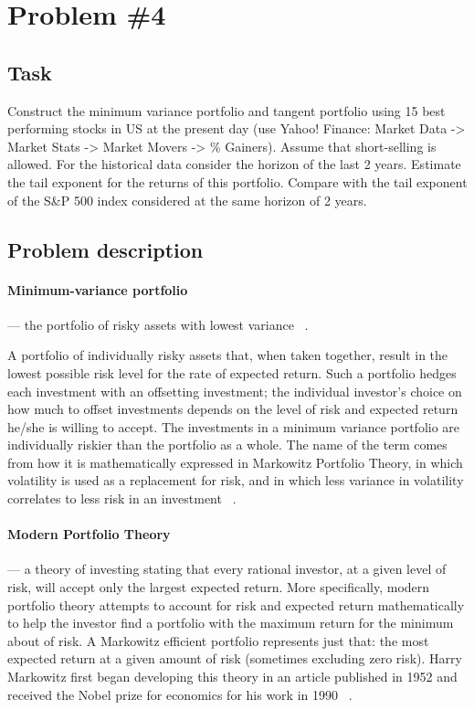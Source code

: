 \newpage \clearpage
\section{Problem \#4}
\label{sec:prob4}

\subsection{Task}
Construct the minimum variance portfolio and tangent portfolio using 15 best performing stocks in US at the present day (use Yahoo! Finance: Market Data -> Market Stats -> Market Movers -> \% Gainers). Assume that short-selling is allowed. For the historical data consider the horizon of the last 2 years. Estimate the tail exponent for the returns of this portfolio. Compare with the tail exponent of the S\&P 500 index considered at the same horizon of 2 years.

\subsection{Problem description}

\paragraph*{Minimum-variance portfolio} --- the portfolio of risky assets with lowest variance ~\cite{Sel1}.

A portfolio of individually risky assets that, when taken together, result in the lowest possible risk level for the rate of expected return. Such a portfolio hedges each investment with an offsetting investment; the individual investor's choice on how much to offset investments depends on the level of risk and expected return he/she is willing to accept. The investments in a minimum variance portfolio are individually riskier than the portfolio as a whole. The name of the term comes from how it is mathematically expressed in Markowitz Portfolio Theory, in which volatility is used as a replacement for risk, and in which less variance in volatility correlates to less risk in an investment ~\cite{Sel2}.

\paragraph*{Modern Portfolio Theory} --- a theory of investing stating that every rational investor, at a given level of risk, will accept only the largest expected return. More specifically, modern portfolio theory attempts to account for risk and expected return mathematically to help the investor find a portfolio with the maximum return for the minimum about of risk. A Markowitz efficient portfolio represents just that: the most expected return at a given amount of risk (sometimes excluding zero risk). Harry Markowitz first began developing this theory in an article published in 1952 and received the Nobel prize for economics for his work in 1990 ~\cite{Sel3}.

